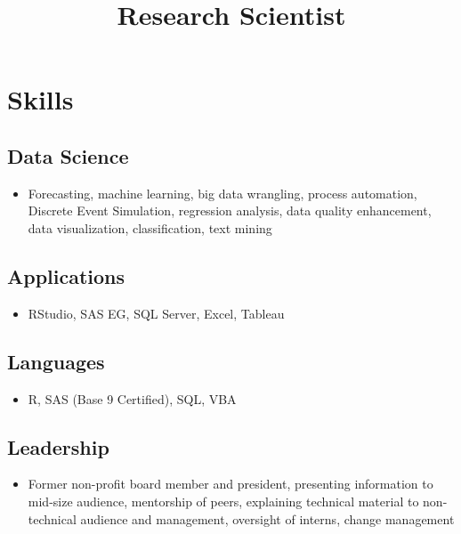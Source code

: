 \documentclass[11pt,a4paper,]{moderncv}
\title{Research Scientist}
\providecommand{\tightlist}{%
	\setlength{\itemsep}{0pt}\setlength{\parskip}{0pt}}
\begin{document}
\makecvtitle



\hypertarget{skills}{%
\section{Skills}\label{skills}}

\hypertarget{data-science}{%
\subsection{Data Science}\label{data-science}}

\begin{itemize}
\tightlist
\item
  Forecasting, machine learning, big data wrangling, process automation, Discrete Event Simulation, regression analysis, data quality enhancement, data visualization, classification, text mining
\end{itemize}

\hypertarget{applications}{%
\subsection{Applications}\label{applications}}

\begin{itemize}
\tightlist
\item
  RStudio, SAS EG, SQL Server, Excel, Tableau
\end{itemize}

\hypertarget{languages}{%
\subsection{Languages}\label{languages}}

\begin{itemize}
\tightlist
\item
  R, SAS (Base 9 Certified), SQL, VBA
\end{itemize}

\hypertarget{leadership}{%
\subsection{Leadership}\label{leadership}}

\begin{itemize}
\tightlist
\item
  Former non-profit board member and president, presenting information to mid-size audience, mentorship of peers, explaining technical material to non-technical audience and management, oversight of interns, change management
\end{itemize}
\end{document}
